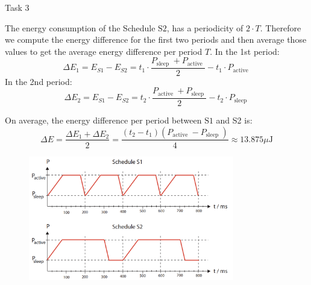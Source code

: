 \begin{frame}[allowframebreaks]{Task 3}{}
  \begin{solutionnoinc}
    The energy consumption of the Schedule $\mathrm{S} 2$, has a periodicity of $2 \cdot T$. Therefore we compute the energy difference for the first two periods and then average those values to get the average energy difference per period $T$. In the 1st period:
    \[
    \Delta E_1=E_{S 1}-E_{S 2}=t_1 \cdot \frac{P_{\text {sleep }}+P_{\text {active }}}{2}-t_1 \cdot P_{\text {active }}
    \]
    In the 2nd period:
    \[
    \Delta E_2=E_{S 1}-E_{S 2}=t_2 \cdot \frac{P_{\text {active }}+P_{\text {sleep }}}{2}-t_2 \cdot P_{\text {sleep }}
    \]
  \end{solutionnoinc}
  \begin{solution}
    On average, the energy difference per period between $\mathrm{S} 1$ and S2 is:
    \[
    \Delta E=\frac{\Delta E_1+\Delta E_2}{2}=\frac{\left(t_2-t_1\right)\left(P_{\text {active }}-P_{\text {sleep }}\right)}{4} \approx 13.875 \mu \mathrm{J}
    \]
  \end{solution}
  \begin{figure}
    \centering
    \includegraphics[width=0.8\textwidth]{./figures/3_overview_1.png}
  \end{figure}
\end{frame}

